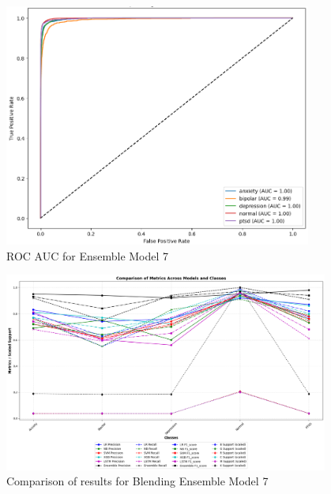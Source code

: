 \begin{figure}[h!]  
    \centering
    \includegraphics[width=0.9\textwidth]{Images/WV ROC.png}  
    \caption{ROC AUC for Ensemble Model 7}
    \label{dfdl1244883}  %
\end{figure}

\begin{figure}[h!]  
    \centering
    \includegraphics[width=0.95\textwidth]{Images/WV RESULT.png}  
    \caption{Comparison of results for Blending Ensemble Model 7}
    \label{dfdl1244883}  %
\end{figure}

